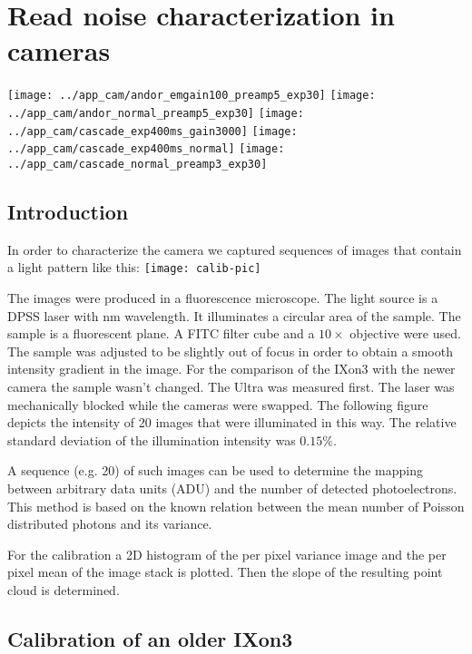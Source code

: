 \chapter{Read noise characterization in cameras}
\label{sec:ccd-meas}
\texttt{[image: ../app\_cam/andor\_emgain100\_preamp5\_exp30]}
\texttt{[image: ../app\_cam/andor\_normal\_preamp5\_exp30]}
\texttt{[image: ../app\_cam/cascade\_exp400ms\_gain3000]}
\texttt{[image: ../app\_cam/cascade\_exp400ms\_normal]}
\texttt{[image: ../app\_cam/cascade\_normal\_preamp3\_exp30]}


\section{Introduction}
In order to characterize the camera we captured sequences of images
that contain a light pattern like this: \texttt{[image: calib-pic]}

The images were produced in a fluorescence microscope. The light
source is a DPSS laser with \unit[473]{nm} wavelength. It illuminates
a circular area of the sample. The sample is a fluorescent plane. A
FITC filter cube and a $10\times$ objective were used. The sample was
adjusted to be slightly out of focus in order to obtain a smooth
intensity gradient in the image. For the comparison of the IXon3 with
the newer camera the sample wasn't changed. The Ultra was measured
first. The laser was mechanically blocked while the cameras were
swapped. The following figure depicts the intensity of 20 images that
were illuminated in this way. The relative standard deviation of the
illumination intensity was $0.15\%$.

A sequence (e.g. 20) of such images can be used to determine the
mapping between arbitrary data units (ADU) and the number of detected
photoelectrons. This method is based on the known relation between the
mean number of Poisson distributed photons and its variance.

For the calibration a 2D histogram of the per pixel
variance image and the per pixel mean of the image stack is
plotted. Then the slope of the resulting point cloud is determined.
\section{Calibration of an older IXon3}

